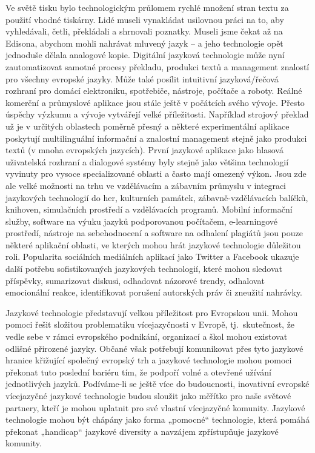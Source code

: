 \begin{multicols}{2}
Ve světě tisku bylo technologickým průlomem rychlé množení stran textu za použití vhodné tiskárny. Lidé museli vynakládat usilovnou práci na to, aby vyhledávali, četli, překládali a shrnovali poznatky. Museli jsme čekat až na Edisona, abychom mohli nahrávat mluvený jazyk – a jeho technologie opět jednoduše dělala analogové kopie.
Digitální jazyková technologie může nyní zautomatizovat samotné procesy překladu, produkci textů a management znalostí pro všechny evropské jazyky. Může také posílit intuitivní jazyková/řečová rozhraní pro domácí elektroniku, spotřebiče, nástroje, počítače a roboty. Reálné komerční a průmyslové aplikace jsou stále ještě v počátcích svého vývoje. Přesto úspěchy výzkumu a vývoje vytvářejí velké příležitosti. Například strojový překlad už je v určitých oblastech poměrně přesný a některé experimentální aplikace poskytují multilinguální informační a znalostní management stejně jako produkci textů (v mnoha evropských jazycích).
První jazykové aplikace jako hlasová uživatelská rozhraní a dialogové systémy byly stejně jako většina technologií vyvinuty pro vysoce specializované oblasti a často mají omezený výkon. Jsou zde ale velké možnosti na trhu ve vzdělávacím a zábavním průmyslu v integraci jazykových technologií do her, kulturních památek, zábavně-vzdělávacích balíčků, knihoven, simulačních prostředí a vzdělávacích programů. Mobilní informační služby, software na výuku jazyků podporovanou počítačem, e-learningové prostředí, nástroje na sebehodnocení a software na odhalení plagiátů jsou pouze některé aplikační oblasti, ve kterých mohou hrát jazykové technologie důležitou roli. Popularita sociálních mediálních aplikací jako Twitter a Facebook ukazuje další potřebu sofistikovaných jazykových technologií, které mohou sledovat příspěvky, sumarizovat diskusi, odhadovat názorové trendy, odhalovat emocionální reakce, identifikovat porušení autorských práv či zneužití nahrávky.


Jazykové technologie představují velkou příležitost pro Evropskou unii. Mohou pomoci řešit složitou problematiku vícejazyčnosti v Evropě, tj.~skutečnost, že vedle sebe v rámci evropského podnikání, organizací a škol mohou existovat odlišné přirozené jazyky. Občané však potřebují komunikovat přes tyto jazykové hranice křižující společný evropský trh a jazykové technologie mohou pomoci překonat tuto poslední bariéru tím, že podpoří volné a otevřené užívání jednotlivých jazyků. Podíváme-li se ještě více do budoucnosti, inovativní evropské vícejazyčné jazykové technologie budou sloužit jako měřítko pro naše světové partnery, kteří je mohou uplatnit pro své vlastní vícejazyčné komunity. Jazykové technologie mohou být chápány jako forma „pomocné“ technologie, která pomáhá překonat „handicap“ jazykové diversity a navzájem zpřístupňuje jazykové komunity.


\end{multicols}
